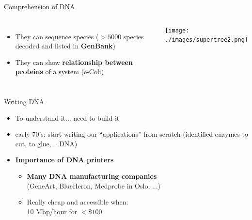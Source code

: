 \begin{frame}{Comprehension of DNA}
\footnotesize
    \begin{columns}[c] %
      \begin{itemize}
      \item They can sequence species ($>5000$ species decoded and listed in \textbf{GenBank})
      \item They can show \textbf{relationship between proteins} of a system (e-Coli)
      \end{itemize} 
  
    \texttt{[image: ./images/supertree2.png]}
    \end{columns}
\end{frame}

\begin{frame}{Writing DNA}
\footnotesize
\begin{itemize}
\item To understand it... need to build it
\item early 70’s: start writing our “applications” from scratch (identified enzymes to cut, to glue,... DNA)
\item \textbf{Importance of DNA printers}
  \begin{itemize}
\footnotesize
  \item \textbf{Many DNA manufacturing companies} \\
	(GeneArt, BlueHeron, Medprobe in Oslo, ...)
  \item Really cheap and accessible when: \\ 10 Mbp/hour for $< \$ 100$
  \end{itemize}
\end{itemize} 
\end{frame}

